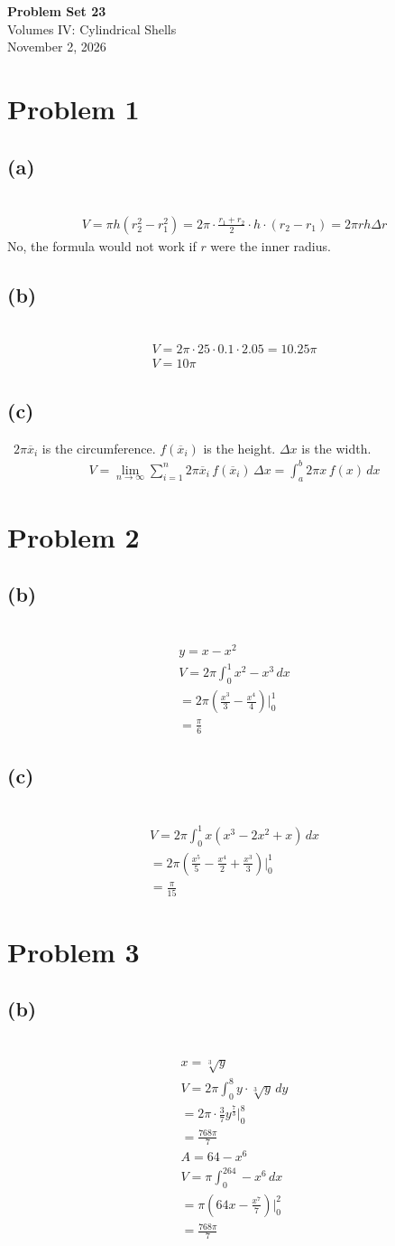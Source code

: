 \documentclass[12pt]{article}
\newcommand*{\cbrt}[1]{\ensuremath{\sqrt[3]{#1}}}
\newcommand{\vem}{\vspace{0.5em}}
\newcommand{\problem}[1]{\section{Problem #1}}
\newcommand{\subproblem}[1]{\subsection{(#1)} \,}
\begin{document}
\vspace*{0cm}

\begin{center}
    {\Large \bfseries Problem Set 23} \\[0.5cm]
    {\large Volumes IV: Cylindrical Shells} \\[0.35cm]
    {\normalsize November 2, 2026}
\end{center}


\problem{1}

\subproblem{a}
\begin{gather*}
    V=\pi h (r_2^2-r_1^2) = 2\pi \cdot \frac{r_1+r_2}{2}\cdot h\cdot (r_2-r_1)=2\pi rh\Delta r
\end{gather*}
No, the formula would not work if $r$ were the inner radius. \vem

\subproblem{b}
\begin{gather*}
    V=2\pi \cdot 25\cdot 0.1\cdot 2.05=10.25 \pi \\
    V=10\pi 
\end{gather*}

\subproblem{c}
$2\pi \overline{x}_i$ is the circumference. $f(\overline{x}_i)$ is the height. $\Delta x$ is the width.
\begin{gather*}
    V= \lim_{n\to \infty} \sum_{i=1}^n 2\pi \overline{x}_i\, f(\overline{x}_i)\, \Delta x =\int_a^b 2\pi x \, f(x)\, dx
\end{gather*}

\problem{2}

\subproblem{b}
\begin{gather*}
    y=x-x^2\\
    V=2\pi \int_0^1 x^2-x^3\, dx\\
    =2\pi (\frac{x^3}{3}-\frac{x^4}{4})\Big|_0^1\\
    = \boxed{\frac{\pi}{6}}
\end{gather*}

\subproblem{c}
\begin{gather*}
    V=2\pi \int_0^1 x(x^3-2x^2+x)\, dx\\
    =2\pi (\frac{x^5}{5}-\frac{x^4}{2}+ \frac{x^3}{3})\Big|_0^1\\
    = \boxed{\frac{\pi}{15}}
\end{gather*}

\problem{3}

\subproblem{b}
\begin{gather*}
    x=\cbrt y\\
    V=2\pi \int_0^8 y\cdot\cbrt y\, dy\\
    = 2\pi \cdot \frac{3}{7} y^\frac{7}{3}\Big|_0^8\\
    = \boxed{\frac{768\pi}{7}}\\
    A= 64-x^6\\
    V=\pi \int_0^264- x^6\, dx\\
    = \pi ( 64x-\frac{x^7}{7} )\Big|_0^2\\
    = \boxed{\frac{768\pi}{7}}
\end{gather*}
\end{document}
